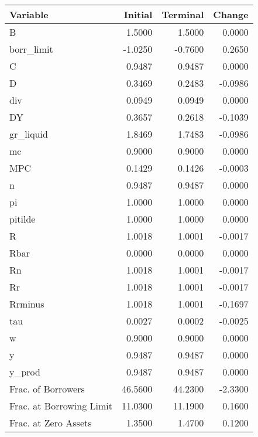 \begin{table}
\centering
\label{tab:stst}
\begin{tabular}{lrrr}
\toprule
                Variable &  Initial &  Terminal &  Change \\
\midrule
                       B &   1.5000 &    1.5000 &  0.0000 \\
              borr\_limit &  -1.0250 &   -0.7600 &  0.2650 \\
                       C &   0.9487 &    0.9487 &  0.0000 \\
                       D &   0.3469 &    0.2483 & -0.0986 \\
                     div &   0.0949 &    0.0949 &  0.0000 \\
                      DY &   0.3657 &    0.2618 & -0.1039 \\
               gr\_liquid &   1.8469 &    1.7483 & -0.0986 \\
                      mc &   0.9000 &    0.9000 &  0.0000 \\
                     MPC &   0.1429 &    0.1426 & -0.0003 \\
                       n &   0.9487 &    0.9487 &  0.0000 \\
                      pi &   1.0000 &    1.0000 &  0.0000 \\
                 pitilde &   1.0000 &    1.0000 &  0.0000 \\
                       R &   1.0018 &    1.0001 & -0.0017 \\
                    Rbar &   0.0000 &    0.0000 &  0.0000 \\
                      Rn &   1.0018 &    1.0001 & -0.0017 \\
                      Rr &   1.0018 &    1.0001 & -0.0017 \\
                 Rrminus &   1.0018 &    1.0001 & -0.1697 \\
                     tau &   0.0027 &    0.0002 & -0.0025 \\
                       w &   0.9000 &    0.9000 &  0.0000 \\
                       y &   0.9487 &    0.9487 &  0.0000 \\
                  y\_prod &   0.9487 &    0.9487 &  0.0000 \\
      Frac. of Borrowers &  46.5600 &   44.2300 & -2.3300 \\
Frac. at Borrowing Limit &  11.0300 &   11.1900 &  0.1600 \\
    Frac. at Zero Assets &   1.3500 &    1.4700 &  0.1200 \\
\bottomrule
\end{tabular}
\end{table}
